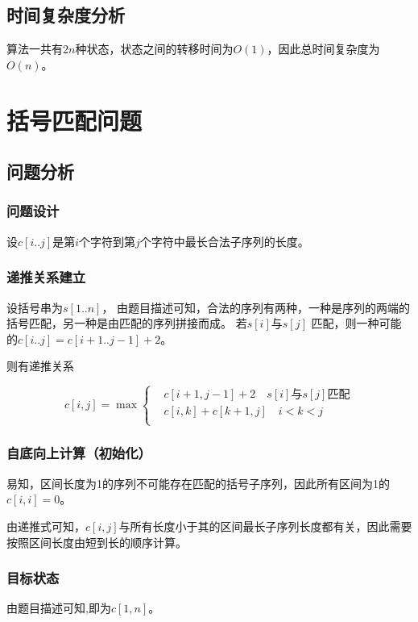\subsection{时间复杂度分析}

算法一共有$2n$种状态，状态之间的转移时间为$O(1)$，因此总时间复杂度为$O(n)$。

\section{括号匹配问题}

\subsection{问题分析}

\subsubsection{问题设计}
设$c[i..j]$是第$i$个字符到第$j$个字符中最长合法子序列的长度。

\subsubsection{递推关系建立}

设括号串为$s[1..n]$，
由题目描述可知，合法的序列有两种，一种是序列的两端的括号匹配，另一种是由匹配的序列拼接而成。
若$s[i]$与$s[j]$ 匹配，则一种可能的$c[i..j] = c[i+1..j-1] + 2$。

则有递推关系

\begin{equation}
    c[i,j]= \max
    \left \{
    \begin{aligned}
        &c[i+1, j-1] + 2 \quad s[i] \text{与} s[j]\text{匹配}\\
        &c[i,k]+c[k+1,j]\quad  i<k<j\\
    \end{aligned}
    \right .
\end{equation}

\subsubsection{自底向上计算（初始化）}
易知，区间长度为1的序列不可能存在匹配的括号子序列，因此所有区间为1的$c[i,i] = 0$。

由递推式可知，$c[i,j]$与所有长度小于其的区间最长子序列长度都有关，因此需要按照区间长度由短到长的顺序计算。

\subsubsection{目标状态}
由题目描述可知,即为$c[1,n]$。

